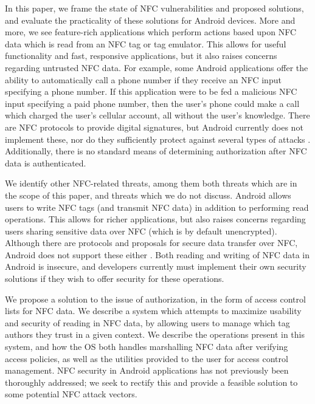 \documentclass[12pt]{article}
\begin{document}
In this paper, we frame the state of NFC vulnerabilities and proposed solutions, and evaluate the practicality of these solutions for Android devices.
More and more, we see feature-rich applications which perform actions based upon NFC data which is read from an NFC tag or tag emulator.
This allows for useful functionality and fast, responsive applications, but it also raises concerns regarding untrusted NFC data.
For example, some Android applications offer the ability to automatically call a phone number if they receive an NFC input specifying a phone number.
If this application were to be fed a malicious NFC input specifying a paid phone number, then the user's phone could make a call which charged the user's cellular account, all without the user's knowledge.
There are NFC protocols to provide digital signatures, but Android currently does not implement these, nor do they sufficiently protect against several types of attacks \cite{roland2011, nfcsignaturertd}.
Additionally, there is no standard means of determining authorization after NFC data is authenticated.

We identify other NFC-related threats, among them both threats which are in the scope of this paper, and threats which we do not discuss.
Android allows users to write NFC tags (and transmit NFC data) in addition to performing read operations.
This allows for richer applications, but also raises concerns regarding users sharing sensitive data over NFC (which is by default unencrypted).
Although there are protocols and proposals for secure data transfer over NFC, Android does not support these either \cite{nfcsignaturertd, nfcsec01}.
Both reading and writing of NFC data in Android is insecure, and developers currently must implement their own security solutions if they wish to offer security for these operations.

We propose a solution to the issue of authorization, in the form of access control lists for NFC data.
We describe a system which attempts to maximize usability and security of reading in NFC data, by allowing users to manage which tag authors they trust in a given context.
We describe the operations present in this system, and how the OS both handles marshalling NFC data after verifying access policies, as well as the utilities provided to the user for access control management.
NFC security in Android applications has not previously been thoroughly addressed; we seek to rectify this and provide a feasible solution to some potential NFC attack vectors.
\end{document}
